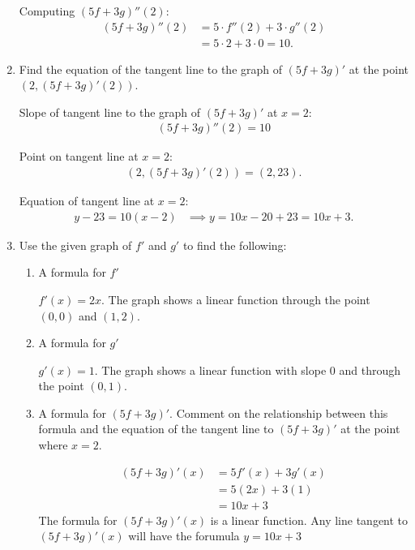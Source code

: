 \documentclass[nooutcomes, handout]{ximera}
\begin{document}
\begin{problem}
\begin{enumerate}
\begin{freeResponse}
         Computing $(5f+3g)''(2)$:
         \begin{align*}
           (5f+3g)''(2) &= 5\cdot f''(2) + 3 \cdot g''(2) \\
                        &= 5 \cdot 2 + 3 \cdot 0 = 10.
         \end{align*}
       \end{freeResponse}

     \item
       Find the equation of the tangent line to the graph of $(5f+3g)'$ at the point $(2, (5f+3g)'(2))$.

       \begin{freeResponse}
         Slope of tangent line to the graph of $(5f+3g)'$ at $x = 2$:
            \begin{align*} 
           (5f+3g)''(2) = 10
         \end{align*}

         Point on tangent line at $x = 2$:
         \begin{align*}
           (2, (5f+3g)'(2)) = (2, 23).
         \end{align*}

         Equation of tangent line at $x = 2$:
         \begin{align*}
           y - 23 = 10(x-2) &\implies y = 10x - 20 + 23 = 10x + 3.
         \end{align*}
       \end{freeResponse}

	\item
	Use the given graph of $f'$ and $g'$ to find the following:
	\begin{enumerate}
		\item A formula for $f'$
			\begin{freeResponse}
				$f'(x)=2x$.  The graph shows a linear function through the point $(0,0)$ and $(1,2)$.
			\end{freeResponse}
	
		\item A formula for $g'$
			\begin{freeResponse}
				$g'(x)=1$.  The graph shows a linear function with slope $0$ and through the point $(0,1)$.
			\end{freeResponse}
		\item A formula for $(5f+3g)'$.  Comment on the relationship between this formula and the equation of the tangent line to $(5f+3g)'$ at the point where $x=2$.
			\begin{freeResponse}
				\begin{align*}
				(5f+3g)'(x)&= 5f'(x)+3g'(x)\\
				&= 5(2x)+3(1)\\
				&=10x+3				
				\end{align*}
			The formula for $(5f+3g)'(x)$ is a linear function. Any line tangent to $(5f+3g)'(x)$  will have the forumula $y=10x+3$
			\end{freeResponse}
	\end{enumerate}
   \end{enumerate}

\end{problem}
\end{document}
